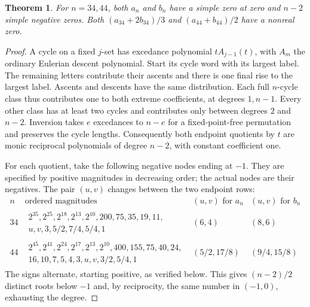 \documentclass[11pt]{article}
\newtheorem{theorem}{Theorem}
\begin{document}
\begin{theorem}
For $n=34,44$, both $a_n$ and $b_n$ have a simple zero at zero and $n-2$ simple negative zeros. Both $(a_{34}+2b_{34})/3$ and $(a_{44}+b_{44})/2$ have a nonreal zero.
\end{theorem}
\begin{proof}
A cycle on a fixed $j$-set has excedance polynomial $tA_{j-1}(t)$, with $A_m$ the ordinary Eulerian descent polynomial. Start its cycle word with its largest label. The remaining letters contribute their ascents and there is one final rise to the largest label. Ascents and descents have the same distribution. Each full $n$-cycle class thus contributes one to both extreme coefficients, at degrees $1,n-1$. Every other class has at least two cycles and contributes only between degrees $2$ and $n-2$. Inversion takes $e$ excedances to $n-e$ for a fixed-point-free permutation and preserves the cycle lengths. Consequently both endpoint quotients by $t$ are monic reciprocal polynomials of degree $n-2$, with constant coefficient one.

For each quotient, take the following negative nodes ending at $-1$. They are specified by positive magnitudes in decreasing order; the actual nodes are their negatives. The pair $(u,v)$ changes between the two endpoint rows:
\[
\begin{array}{c|l|c|c}
n&\text{ordered magnitudes}&(u,v)\text{ for }a_n &(u,v)\text{ for }b_n\\ \hline
34&\begin{gathered}2^{35},2^{25},2^{18},2^{13},2^{10},200,75,35,19,11,\\
u,v,3,5/2,7/4,5/4,1\end{gathered}&(6,4)&(8,6)\\[3pt]
44&\begin{gathered}2^{45},2^{41},2^{24},2^{17},2^{13},2^{10},400,155,75,40,24,\\
16,10,7,5,4,3,u,v,3/2,5/4,1\end{gathered}&(5/2,17/8)&(9/4,15/8)
\end{array}
\]
The signs alternate, starting positive, as verified below. This gives $(n-2)/2$ distinct roots below $-1$ and, by reciprocity, the same number in $(-1,0)$, exhausting the degree.


\end{proof}
\end{document}
